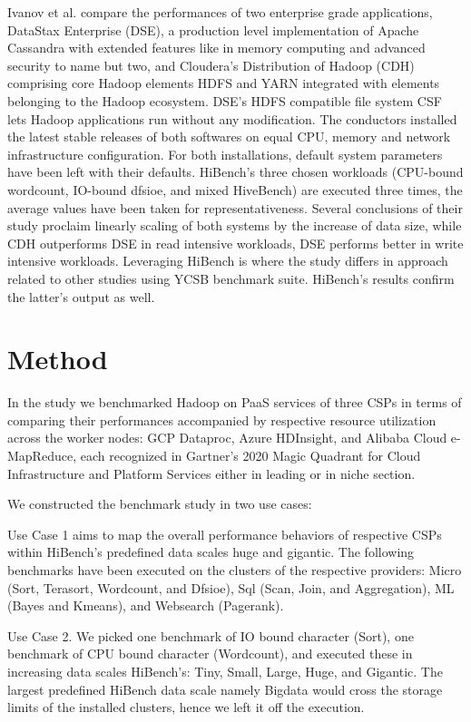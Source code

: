 \documentclass[review]{elsarticle}
\begin{document}
Ivanov et al. \cite{ivanov_performance_2015} compare the performances of two enterprise grade applications, DataStax Enterprise (DSE), a production level implementation of Apache Cassandra with extended features like in memory computing and advanced security to name but two, and Cloudera’s Distribution of Hadoop (CDH) comprising core Hadoop elements HDFS and YARN integrated with elements belonging to the Hadoop ecosystem. DSE’s HDFS compatible file system CSF lets Hadoop applications run without any modification. The conductors installed the latest stable releases of both softwares on equal CPU, memory and network infrastructure configuration. For both installations, default system parameters have been left with their defaults. HiBench’s three chosen workloads (CPU-bound wordcount, IO-bound dfsioe, and mixed HiveBench) are executed three times, the average values have been taken for representativeness. Several conclusions of their study proclaim linearly scaling of both systems by the increase of data size, while CDH outperforms DSE in read intensive workloads, DSE performs better in write intensive workloads. Leveraging HiBench is where the study differs in approach related to other studies using YCSB benchmark suite. HiBench’s results confirm the latter’s output as well.




\section{Method}


In the study we benchmarked Hadoop on PaaS services of three CSPs in terms of comparing their performances accompanied by respective resource utilization across the worker nodes: GCP Dataproc, Azure HDInsight, and Alibaba Cloud e-MapReduce, each recognized in Gartner's 2020 Magic Quadrant for Cloud Infrastructure and Platform Services \cite{noauthor_gartner_nodate} either in leading or in niche section.

We constructed the benchmark study in two use cases: 

Use Case 1 aims to map the overall performance behaviors of respective CSPs within HiBench's predefined data scales huge and gigantic. The following benchmarks have been executed on the clusters of the respective providers: Micro (Sort, Terasort, Wordcount, and Dfsioe), Sql (Scan, Join, and Aggregation), ML (Bayes and Kmeans), and Websearch (Pagerank).

Use Case 2. We picked one benchmark of IO bound character (Sort), one benchmark of CPU bound character (Wordcount), and executed these in increasing data scales HiBench's: Tiny, Small, Large, Huge, and Gigantic. The largest predefined HiBench data scale namely Bigdata would cross the storage limits of the installed clusters, hence we left it off the execution. 
\end{document}
